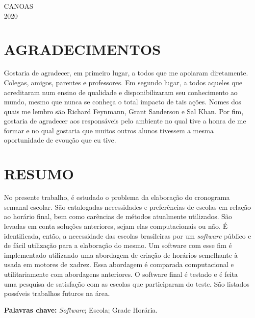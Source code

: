 \documentclass[12pt,a4paper]{article}
\newenvironment{bottompar}{\par\vspace*{\fill}}{\clearpage}
\begin{document}
	\begin{bottompar}
		\begin{center}
			CANOAS \\
			2020
		\end{center}
	\end{bottompar}


	\thispagestyle{empty}
	\section*{AGRADECIMENTOS}

	Gostaria de agradecer, em primeiro lugar, a todos que me apoiaram diretamente. Colegas, amigos, parentes e professores. Em segundo lugar, a todos aqueles que acreditaram num ensino de qualidade e disponibilizaram seu conhecimento ao mundo, mesmo que nunca se conheça o total impacto de tais ações. Nomes dos quais me lembro são Richard Feynmann, Grant Sanderson e Sal Khan. Por fim, gostaria de agradecer aos responsáveis pelo ambiente no qual tive a honra de me formar e no qual gostaria que muitos outros alunos tivessem a mesma oportunidade de evoução que eu tive.

	\newpage


	\thispagestyle{empty}
	\section*{RESUMO}

	No presente trabalho, é estudado o problema da elaboração do cronograma semanal escolar. São catalogadas necessidades e preferências de escolas em relação ao horário final, bem como carências de métodos atualmente utilizados. São levadas em conta soluções anteriores, sejam elas computacionais ou não. É identificada, então, a necessidade das escolas brasileiras por um \textit{software} público e de fácil utilização para a elaboração do mesmo. Um software com esse fim é implementado utilizando uma abordagem de criação de horários semelhante à usada em motores de xadrez. Essa abordagem é comparada	computacional e utilitariamente com abordagens anteriores. O software final é testado e é feita uma pesquisa de satisfação com as escolas que participaram do teste. São listados possíveis trabalhos futuros na área.


	\begingroup
		\setlength{\parindent}{0mm}
		\textbf{Palavras chave:} \textit{Software}; Escola; Grade Horária.
	\endgroup
	\newpage
\end{document}
